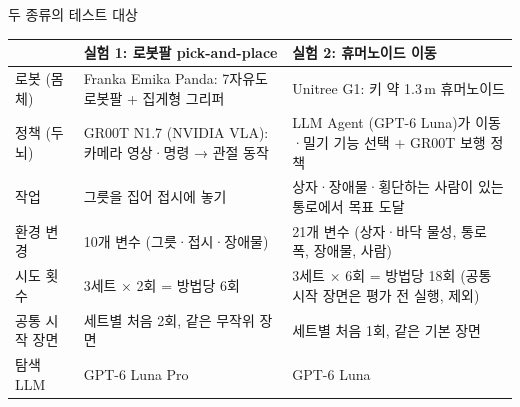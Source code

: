 \documentclass[aspectratio=169,11pt]{beamer}
\begin{document}
\begin{frame}{두 종류의 테스트 대상}
\vspace{3mm}
\small
\begin{tabularx}{\textwidth}{@{}p{28mm}YY@{}}
\toprule
& 실험 1: 로봇팔 pick-and-place & 실험 2: 휴머노이드 이동 \\
\midrule
로봇 (몸체) & Franka Emika Panda: 7자유도 로봇팔 + 집게형 그리퍼 & Unitree G1: 키 약 1.3\,m 휴머노이드 \\
정책 (두뇌) & GR00T N1.7 (NVIDIA VLA): 카메라 영상·명령 → 관절 동작 & LLM Agent (GPT-6 Luna)가 이동·밀기 기능 선택 + GR00T 보행 정책 \\
작업 & 그릇을 집어 접시에 놓기 & 상자·장애물·횡단하는 사람이 있는 통로에서 목표 도달 \\
환경 변경 & 10개 변수 (그릇·접시·장애물) & 21개 변수 (상자·바닥 물성, 통로 폭, 장애물, 사람) \\
시도 횟수 & 3세트 × 2회 = 방법당 6회 & 3세트 × 6회 = 방법당 18회 (공통 시작 장면은 평가 전 실행, 제외) \\
공통 시작 장면 & 세트별 처음 2회, 같은 무작위 장면 & 세트별 처음 1회, 같은 기본 장면 \\
탐색 LLM & GPT-6 Luna Pro & GPT-6 Luna \\
\bottomrule
\end{tabularx}
\end{frame}
\end{document}
